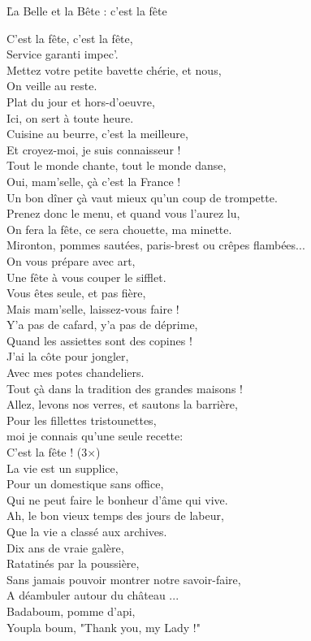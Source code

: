 \documentclass{novel}
\begin{document}
\newpage
\small
\h*{La Belle et la Bête : c’est la fête}
\begin{multicols}{2}
C'est la fête, c'est la fête, \\
Service garanti impec'. \\
Mettez votre petite bavette chérie, et nous, \\
On veille au reste. \\
Plat du jour et hors-d'oeuvre, \\
Ici, on sert à toute heure. \\
Cuisine au beurre, c'est la meilleure, \\
Et croyez-moi, je suis connaisseur ! \\
Tout le monde chante, tout le monde danse, \\
Oui, mam'selle, çà c'est la France ! \\
Un bon dîner çà vaut mieux qu'un coup de trompette. \\
Prenez donc le menu, et quand vous l'aurez lu, \\
On fera la fête, ce sera chouette, ma minette. \\
Mironton, pommes sautées, paris-brest ou crêpes flambées... \\
On vous prépare avec art, \\
Une fête à vous couper le sifflet. \\
Vous êtes seule, et pas fière, \\
Mais mam'selle, laissez-vous faire ! \\
Y'a pas de cafard, y'a pas de déprime, \\
Quand les assiettes sont des copines ! \\
J'ai la côte pour jongler, \\
Avec mes potes chandeliers. \\

Tout çà dans la tradition des grandes maisons ! \\
Allez, levons nos verres, et sautons la barrière, \\
Pour les fillettes tristounettes, \\
moi je connais qu'une seule recette: \\

C'est la fête ! (3×) \\

La vie est un supplice, \\
Pour un domestique sans office, \\
Qui ne peut faire le bonheur d'âme qui vive. \\
Ah, le bon vieux temps des jours de labeur, \\
Que la vie a classé aux archives. \\
Dix ans de vraie galère, \\
Ratatinés par la poussière, \\
Sans jamais pouvoir montrer notre savoir-faire, \\
A déambuler autour du château ... \\
Badaboum, pomme d'api, \\
Youpla boum, "Thank you, my Lady !" \\


\end{multicols}
\end{document}
